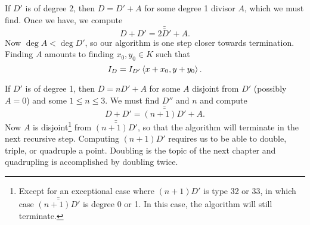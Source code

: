 If $D'$ is of degree 2, then $D = D' + A$ for some degree 1 divisor $A$, which we must find.
Once we have, we compute
  \[ D + D' = \bar{\bar{2D'}} + A. \]
Now $\deg A < \deg D'$, so our algorithm is one step closer towards termination.
Finding $A$ amounts to finding $x_0, y_0 \in K$ such that
  \[ I_D = I_{D'}\left\langle x + x_0, y + y_0 \right\rangle. \]

If $D'$ is of degree 1, then $D = nD' + A$ for some $A$ disjoint from $D'$ (possibly $A = 0$)
and some $1 \leq n \leq 3$.
We must find $D''$ and $n$ and compute
  \[ D + D' = \bar{\bar{(n + 1)D'}} + A. \]
Now $A$ is disjoint\footnote
{Except for an exceptional case where $(n + 1)D'$ is type 32 or 33,
in which case $\bar{\bar{(n + 1)D'}}$ is degree 0 or 1.
In this case, the algorithm will still terminate.}
from $\bar{\bar{(n + 1)D'}}$, so that the algorithm will terminate in the next recursive step.
Computing $(n + 1)D'$ requires us to be able to double, triple, or quadruple a point.
Doubling is the topic of the next chapter and quadrupling is accomplished by doubling twice.

